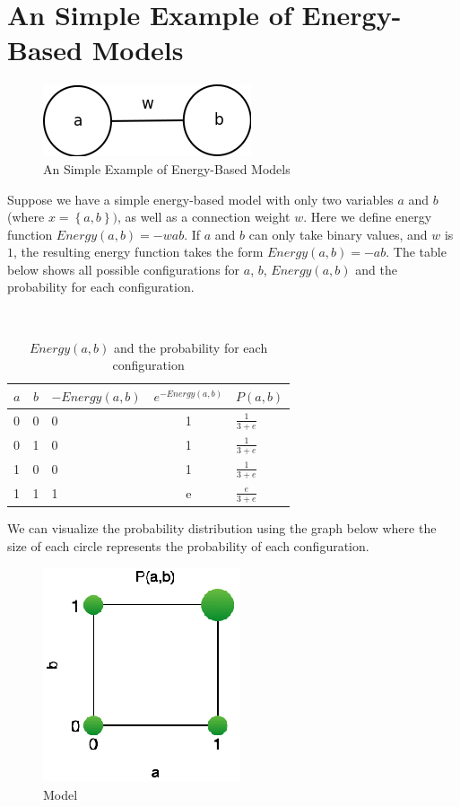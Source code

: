 \documentclass[11pt,fleqn, UTF8]{ctexbook} %
\begin{document}
\section{An Simple Example of Energy-Based Models}
\begin{figure}[t]
 \centering
 \includegraphics{pics/add1.png}
 \caption{An Simple Example of Energy-Based Models}
 \label{fig:add1}
\end{figure}
Suppose we have a simple energy-based model with only two variables $a$  and $b$  (where $x=\left \{ a, b \right \})$, as well as a connection weight $w$. Here we define energy function $Energy(a,b)=-wab$. If $a$ and $b$ can only take binary values, and $w$ is $1$, the resulting energy function takes the form $Energy(a,b)=-ab$. The table below shows all possible configurations for $a$, $b$, $Energy(a,b)$ and the probability for each configuration.
\begin{table}[htbp]
\
\begin{center}
  \caption{\label{tab:Energy}$Energy(a,b)$ and the probability for each configuration}
 \begin{tabular}{lclcl}
  \toprule
  $a$ & $b$ & $-Energy(a,b)$ & $e^{-Energy(a,b)}$ & $P(a,b)$ \\
  \midrule
 0 & 0 & 0& 1 & $\frac{1}{3+e}$\\
 0 & 1 & 0& 1 & $\frac{1}{3+e}$\\
 1 & 0 & 0& 1 & $\frac{1}{3+e}$\\
 1 & 1 & 1& e & $\frac{e}{3+e}$\\
  \bottomrule
 \end{tabular}
\end{center}

\end{table}

We can visualize the probability distribution using the graph below where the size of each circle represents the probability of each configuration.

\begin{figure}[t]
 \centering
 \includegraphics{pics/add2.png}
 \caption{Model}
 \label{fig:add2}
\end{figure}
\end{document}
